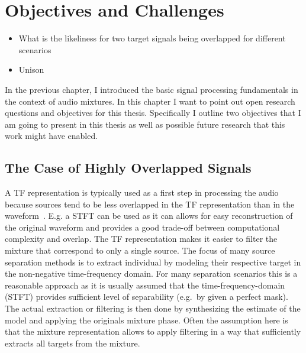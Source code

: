 \hypertarget{objectives-and-challenges}{%
\chapter{Objectives and Challenges}\label{objectives-and-challenges}}

\begin{itemize}
  \item What is the likeliness for two target signals being overlapped for different scenarios
  \item Unison
\end{itemize}

In the previous chapter, I introduced the basic signal processing fundamentals in the context of audio mixtures.
In this chapter I want to point out open research questions and objectives for this thesis.
Specifically I outline two objectives that I am going to present in this thesis as well as possible future research that this work might have enabled.

\hypertarget{highly-overlapped-signals}{%
\section{The Case of Highly Overlapped Signals}\label{highly-overlapped-signals}}

A TF representation is typically used as a first step in processing the audio because sources tend to be less overlapped in the TF representation than in the waveform~\cite{rickard02, giannoulis11}.
E.g. a STFT can be used as it can allows for easy reconstruction of the original waveform and provides a good trade-off between computational complexity and overlap.
The TF representation makes it easier to filter the mixture that correspond to only a single source.
The focus of many source separation methods is to extract individual by modeling their respective target in the non-negative
time-frequency domain.
For many separation scenarios this is a reasonable approach as it is usually assumed that the time-frequency-domain (STFT) provides sufficient level of separability (e.g.~by given a perfect mask).
The actual extraction or filtering is then done by synthesizing the estimate of the model and applying the originals mixture phase.
Often the assumption here is that the mixture representation allows to apply filtering in a way that sufficiently extracts all targets from the mixture.
\\

